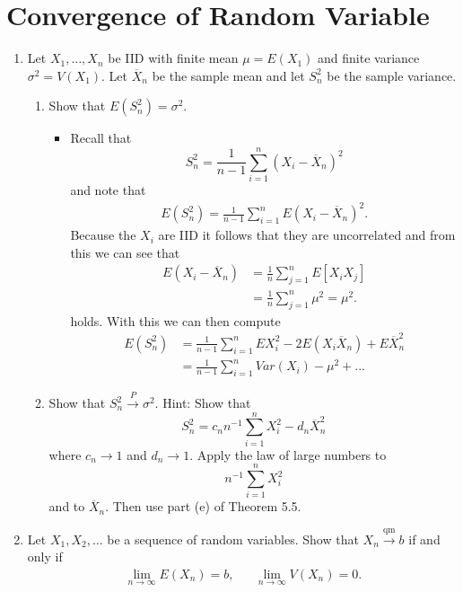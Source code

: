 \documentclass{article}
\begin{document}
\section{Convergence of Random Variable}
\begin{enumerate}
	\item Let $X_1, \dots, X_n$ be IID with finite mean $\mu = E(X_1)$ and finite variance $\sigma^2 = V(X_1)$. Let $\overline{X}_n$ be the sample mean and let $S_n^2$ be the sample variance.
		\begin{enumerate}
			\item Show that $E(S_n^2) = \sigma^2$.
				\begin{itemize}
					\item Recall that
					$$
					S_n^2 = \frac{1}{n - 1} \sum_{i = 1}^n (X_i - \overline{X}_n)^2
					$$
					and note that
					$$
					\begin{aligned}
					E(S_n^2) = \frac{1}{n - 1} \sum_{i = 1}^n E(X_i - \overline{X}_n)^2.
					\end{aligned}
					$$
					Because the $X_i$ are IID it follows that they are uncorrelated and from this we can see that
					$$
					\begin{aligned}
					E(X_i - \overline{X}_n) &= \frac{1}{n} \sum_{j = 1}^n E[X_iX_j] \\
					&= \frac{1}{n} \sum_{j = 1}^n \mu^2 = \mu^2.
					\end{aligned}
					$$
					holds. With this we can then compute
					$$
					\begin{aligned}
					E(S_n^2) &= \frac{1}{n - 1} \sum_{i = 1}^n EX_i^2 - 2 E(X_i \overline{X}_n) + E\overline{X}_n^2 \\
					&= \frac{1}{n - 1} \sum_{i = 1}^n Var(X_i) - \mu^2 + ...
					\end{aligned}
					$$
				\end{itemize}
			\item Show that $S_n^2 \overset{P}{\rightarrow} \sigma^2$. Hint: Show that
			$$
			S_n^2 = c_n n^{-1}\sum_{i = 1}^n X_i^2 - d_n \overline{X}_n^2
			$$
			where $c_n \rightarrow 1$ and $d_n \rightarrow 1$. Apply the law of large numbers to
			$$
			n^{-1} \sum_{i = 1}^n X_i^2
			$$
			and to $\overline{X}_n$. Then use part (e) of Theorem 5.5.
		\end{enumerate}
	\item Let $X_1, X_2, \dots$ be a sequence of random variables. Show that $X_n \overset{\operatorname{qm}}{\longrightarrow} b$ if and only if
	$$
	\begin{aligned}
	\lim_{n \rightarrow \infty} E(X_n) = b,&&\lim_{n \rightarrow \infty}V(X_n) = 0.

\end{aligned}$$
\end{enumerate}
\end{document}
